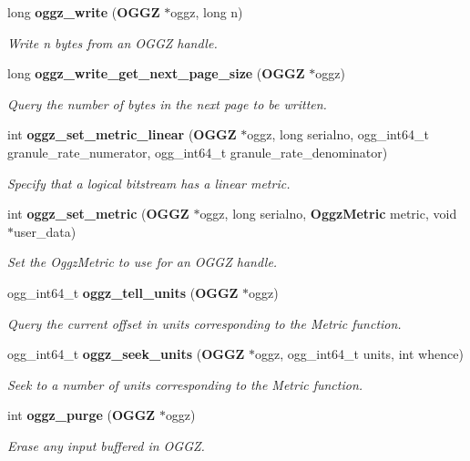 \begin{CompactItemize}
long {\bf oggz\_\-write} ({\bf OGGZ} $\ast$oggz, long n)
\begin{CompactList}\small\item\em Write n bytes from an OGGZ handle. \item\end{CompactList}\item 
long {\bf oggz\_\-write\_\-get\_\-next\_\-page\_\-size} ({\bf OGGZ} $\ast$oggz)
\begin{CompactList}\small\item\em Query the number of bytes in the next page to be written. \item\end{CompactList}\item 
int {\bf oggz\_\-set\_\-metric\_\-linear} ({\bf OGGZ} $\ast$oggz, long serialno, ogg\_\-int64\_\-t granule\_\-rate\_\-numerator, ogg\_\-int64\_\-t granule\_\-rate\_\-denominator)
\begin{CompactList}\small\item\em Specify that a logical bitstream has a linear metric. \item\end{CompactList}\item 
int {\bf oggz\_\-set\_\-metric} ({\bf OGGZ} $\ast$oggz, long serialno, {\bf Oggz\-Metric} metric, void $\ast$user\_\-data)
\begin{CompactList}\small\item\em Set the Oggz\-Metric to use for an OGGZ handle. \item\end{CompactList}\item 
ogg\_\-int64\_\-t {\bf oggz\_\-tell\_\-units} ({\bf OGGZ} $\ast$oggz)
\begin{CompactList}\small\item\em Query the current offset in units corresponding to the Metric function. \item\end{CompactList}\item 
ogg\_\-int64\_\-t {\bf oggz\_\-seek\_\-units} ({\bf OGGZ} $\ast$oggz, ogg\_\-int64\_\-t units, int whence)
\begin{CompactList}\small\item\em Seek to a number of units corresponding to the Metric function. \item\end{CompactList}\item 
int {\bf oggz\_\-purge} ({\bf OGGZ} $\ast$oggz)
\begin{CompactList}\small\item\em Erase any input buffered in OGGZ. \item\end{CompactList}\item 

\end{CompactItemize}
